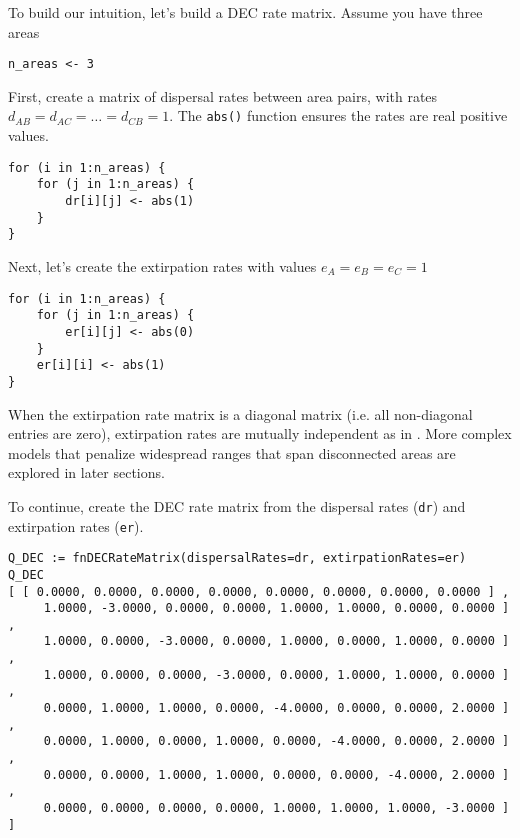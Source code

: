 To build our intuition, let's build a DEC rate matrix.
Assume you have three areas

\begin{snugshade}
\begin{lstlisting}
n_areas <- 3
\end{lstlisting}
\end{snugshade}

First, create a matrix of dispersal rates between area pairs, with rates $d_{AB} = d_{AC} = \ldots = d_{CB} = 1$. The {\tt abs()} function ensures the rates are real positive values.

\begin{snugshade}
\begin{lstlisting}
for (i in 1:n_areas) {
    for (j in 1:n_areas) {
        dr[i][j] <- abs(1)
    }
}
\end{lstlisting}
\end{snugshade}

Next, let's create the extirpation rates with values $e_A=e_B=e_C=1$

\begin{snugshade}
\begin{lstlisting}
for (i in 1:n_areas) {
    for (j in 1:n_areas) {
        er[i][j] <- abs(0)
    }
    er[i][i] <- abs(1) 
}
\end{lstlisting}
\end{snugshade}

When the extirpation rate matrix is a diagonal matrix (i.e. all non-diagonal entries are zero), extirpation rates are mutually independent as in \citep{Ree2005}.
More complex models that penalize widespread ranges that span disconnected areas are explored in later sections.

To continue, create the DEC rate matrix from the dispersal rates ({\tt dr}) and extirpation rates ({\tt er}).

\begin{snugshade}
\begin{lstlisting}
Q_DEC := fnDECRateMatrix(dispersalRates=dr, extirpationRates=er)
Q_DEC
[ [ 0.0000, 0.0000, 0.0000, 0.0000, 0.0000, 0.0000, 0.0000, 0.0000 ] ,
     1.0000, -3.0000, 0.0000, 0.0000, 1.0000, 1.0000, 0.0000, 0.0000 ] ,
     1.0000, 0.0000, -3.0000, 0.0000, 1.0000, 0.0000, 1.0000, 0.0000 ] ,
     1.0000, 0.0000, 0.0000, -3.0000, 0.0000, 1.0000, 1.0000, 0.0000 ] ,
     0.0000, 1.0000, 1.0000, 0.0000, -4.0000, 0.0000, 0.0000, 2.0000 ] ,
     0.0000, 1.0000, 0.0000, 1.0000, 0.0000, -4.0000, 0.0000, 2.0000 ] ,
     0.0000, 0.0000, 1.0000, 1.0000, 0.0000, 0.0000, -4.0000, 2.0000 ] ,
     0.0000, 0.0000, 0.0000, 0.0000, 1.0000, 1.0000, 1.0000, -3.0000 ] ]
\end{lstlisting}
\end{snugshade}

